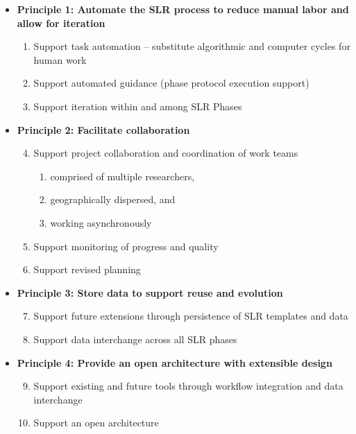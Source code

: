 \vspace{-8pt}
\begin{itemize} 
\item \textbf{Principle 1: Automate the SLR process to reduce manual labor and allow for iteration}
	\begin{enumerate}
		\item Support task automation -- substitute algorithmic and computer cycles for human work
		\vspace{-4pt}
		\item Support automated guidance (phase protocol execution support)
		\vspace{-4pt}
		\item Support iteration within and among SLR Phases
	\end{enumerate}
\item \textbf{Principle 2: Facilitate collaboration }
	\begin{enumerate}
		\setcounter{enumi}{3}
		\vspace{-4pt}
		\item Support project collaboration and coordination of work teams
		\vspace{-4pt}	
		\begin{enumerate}
			\item comprised of multiple researchers,
			\item geographically dispersed, and
			\item working asynchronously
			\end{enumerate}
		\item Support monitoring of progress and quality
		\vspace{-4pt}
		\item Support revised planning
	\end{enumerate}
\item \textbf{Principle 3: Store data to support reuse and evolution}
	\begin{enumerate}
		\setcounter{enumi}{6}
		\vspace{-4pt}
		\item Support future extensions through persistence of SLR templates and data
		\vspace{-4pt}
		\item Support data interchange across all SLR phases
	\end{enumerate}
\item \textbf{Principle 4: Provide an open architecture with extensible design}
	\begin{enumerate}
		\setcounter{enumi}{8}		
		\vspace{-4pt}
		\item Support existing and future tools through workflow integration and data interchange
		\vspace{-4pt}
		\item Support an open architecture
	\end{enumerate}
\end{itemize}
\vspace{-4pt}

